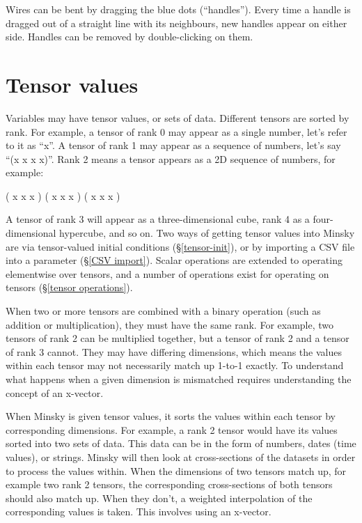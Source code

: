 Wires can be bent by dragging the blue dots (``handles''). Every time
a handle is dragged out of a straight line with its neighbours, new
handles appear on either side. Handles can be removed by
double-clicking on them.

\section{Tensor values}

Variables may have tensor values, or sets of data. Different tensors
are sorted by rank. For example, a tensor of rank 0 may appear as a
single number, let's refer to it as ``x''. A tensor of rank 1 may appear
as a sequence of numbers, let's say ``(x x x x)''. Rank 2 means a tensor
appears as a 2D sequence of numbers, for example:

( x x x )
( x x x )
( x x x )

A tensor of rank 3 will appear as a three-dimensional cube,
rank 4 as a four-dimensional hypercube, and so on. Two 
ways of getting tensor values into Minsky are via tensor-valued 
initial conditions (\S\ref{tensor-init}), or by importing a CSV 
file into a parameter (\S\ref{CSV import}). Scalar 
operations are extended to operating elementwise over tensors, 
and a number of operations exist for operating on tensors 
(\S\ref{tensor operations}).

When two or more tensors are combined with a binary operation (such 
as addition or multiplication), they must have the same rank. For example,
two tensors of rank 2 can be multiplied together, but a tensor of rank 2 and 
a tensor of rank 3 cannot. They may have differing dimensions, which means
the values within each tensor may not necessarily match up 1-to-1 exactly.
To understand what happens when a given dimension is mismatched requires 
understanding the concept of an x-vector.

When Minsky is given tensor values, it sorts the values within each tensor
by corresponding dimensions. For example, a rank 2 tensor would have its
values sorted into two sets of data. This data can be in the form of numbers,
dates (time values), or strings. Minsky will then look at cross-sections of the
datasets in order to process the values within. When the dimensions of two
tensors match up, for example two rank 2 tensors, the corresponding
cross-sections of both tensors should also match up. When they don't, a
weighted interpolation of the corresponding values is taken. This involves
using an x-vector. 

